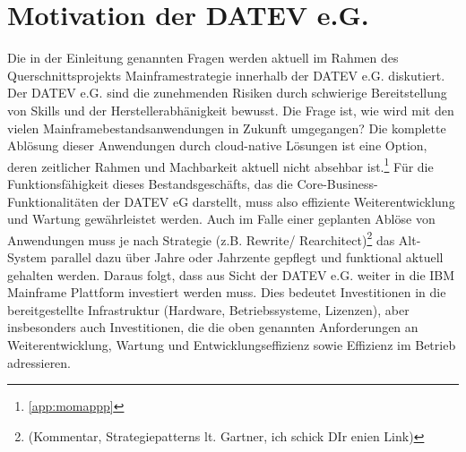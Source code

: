 \chapter{Motivation der DATEV e.G.}\label{ch:Firmenkontext}
Die in der Einleitung genannten Fragen werden aktuell im Rahmen des Querschnittsprojekts \glqq Mainframestrategie\grqq{} innerhalb der DATEV e.G. diskutiert. 
Der DATEV e.G. sind die zunehmenden Risiken durch schwierige Bereitstellung von Skills und der Herstellerabhänigkeit bewusst. 
Die Frage ist, wie wird mit den vielen Mainframebestandsanwendungen in Zukunft umgegangen?
Die komplette Ablösung dieser Anwendungen durch cloud-native Lösungen ist eine Option, deren zeitlicher Rahmen und Machbarkeit aktuell nicht absehbar ist.\footnote{\ref{app:momappp} }
Für die Funktionsfähigkeit dieses Bestandsgeschäfts, das die Core-Business-Funktionalitäten der DATEV eG darstellt, muss also effiziente Weiterentwicklung und Wartung gewährleistet werden.
Auch im Falle einer geplanten Ablöse von Anwendungen muss je nach Strategie (z.B. \glqq Rewrite\grqq / \glqq Rearchitect\grqq)\footnote{(Kommentar, Strategiepatterns lt. Gartner, ich schick DIr enien Link)} das Alt-System parallel dazu über Jahre oder Jahrzente gepflegt und funktional aktuell gehalten werden.
Daraus folgt, dass aus Sicht der DATEV e.G. weiter in die IBM Mainframe Plattform investiert werden muss. 
Dies bedeutet Investitionen in die bereitgestellte Infrastruktur (Hardware, Betriebssysteme, Lizenzen), aber insbesonders auch Investitionen, die die oben genannten Anforderungen an Weiterentwicklung, Wartung und Entwicklungseffizienz sowie Effizienz im Betrieb adressieren.

